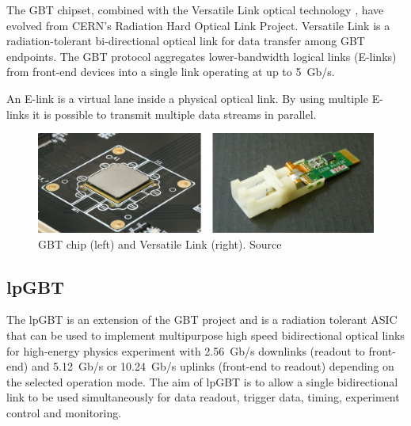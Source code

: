 The \ac{GBT} chipset, combined with the Versatile Link optical technology \cite{gbt-versatile-link}, have evolved from \ac{CERN}'s Radiation Hard Optical Link Project. Versatile Link is a radiation-tolerant bi-directional optical link for data transfer among \acs{GBT} endpoints. The \ac{GBT} protocol aggregates lower-bandwidth logical links (\acs{E-link}s) from front-end devices into a single link operating at up to 5~Gb/s.

\begin{definition}
\label{def:elink}
An \acs{E-link} is a virtual lane inside a physical optical link. By using multiple \acs{E-link}s it is possible to transmit multiple data streams in parallel.
\end{definition}

\begin{figure}[H]
\centering
\includegraphics[width=\textwidth]{images/felix/gbt.jpg}
\caption[GBT and Versatile Link]{\acs{GBT} chip (left) and Versatile Link (right). Source \protect\cite{gbt-versatile-link}}
\label{fig:gbt-versalink-combined}
\end{figure}

\subsection{\acf{lpGBT}}
\label{subsec:felix-lpgbt}

The \acf{lpGBT} \cite{lpgbt} is an extension of the \acf{GBT} project and is a radiation tolerant \acs{ASIC} that can be used to implement multipurpose high speed bidirectional optical links for high-energy physics experiment with 2.56~Gb/s downlinks (readout to front-end) and 5.12~Gb/s or 10.24~Gb/s uplinks (front-end to readout) depending on the selected operation mode. The aim of \acs{lpGBT} is to allow a single bidirectional link to be used simultaneously for data readout, trigger data, timing, experiment control and monitoring.

